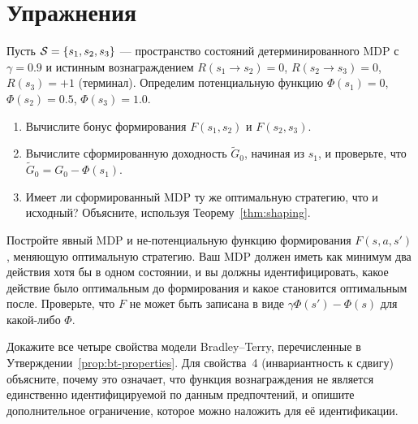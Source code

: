 \section*{Упражнения}

\begin{exercise}
\label{ex:shaping-1}
Пусть $\mathcal{S} = \{s_1, s_2, s_3\}$ --- пространство состояний детерминированного MDP с $\gamma = 0.9$ и истинным вознаграждением $R(s_1 \to s_2) = 0$, $R(s_2 \to s_3) = 0$, $R(s_3) = +1$ (терминал). Определим потенциальную функцию $\Phi(s_1) = 0$, $\Phi(s_2) = 0.5$, $\Phi(s_3) = 1.0$.
\begin{enumerate}
  \item Вычислите бонус формирования $F(s_1, s_2)$ и $F(s_2, s_3)$.
  \item Вычислите сформированную доходность $\tilde{G}_0$, начиная из $s_1$, и проверьте, что $\tilde{G}_0 = G_0 - \Phi(s_1)$.
  \item Имеет ли сформированный MDP ту же оптимальную стратегию, что и исходный? Объясните, используя Теорему~\ref{thm:shaping}.
\end{enumerate}
\end{exercise}

\begin{exercise}
\label{ex:shaping-non-potential}
Постройте явный MDP и не-потенциальную функцию формирования $F(s,a,s')$, меняющую оптимальную стратегию. Ваш MDP должен иметь как минимум два действия хотя бы в одном состоянии, и вы должны идентифицировать, какое действие было оптимальным до формирования и какое становится оптимальным после. Проверьте, что $F$ не может быть записана в виде $\gamma\Phi(s') - \Phi(s)$ для какой-либо $\Phi$.
\end{exercise}

\begin{exercise}
\label{ex:bt-properties}
Докажите все четыре свойства модели Bradley--Terry, перечисленные в Утверждении~\ref{prop:bt-properties}. Для свойства~4 (инвариантность к сдвигу) объясните, почему это означает, что функция вознаграждения не является единственно идентифицируемой по данным предпочтений, и опишите дополнительное ограничение, которое можно наложить для её идентификации.
\end{exercise}

